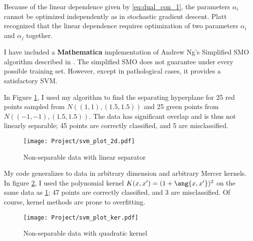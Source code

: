 \documentclass[10pt]{article}
\begin{document}
Because of the linear dependence given by \eqref{eq:dual_con_1}, the parameters $\alpha_{i}$ cannot be optimized independently as in stochastic gradient descent. Platt recognized that the linear dependence requires optimization of two parameters $\alpha_{i}$ and $\alpha_{j}$ together.

I have included a \textbf{Mathematica} implementation of Andrew Ng's Simplified SMO algorithm described in \cite{ng_smo}. The simplified SMO does not guarantee under every possible training set. However, except in pathological cases, it provides a satisfactory SVM.

In Figure \ref{fig:svm_plot_2d}, I used my algorithm to find the separating hyperplane for 25 red points sampled from $N((1,1),(1.5,1.5))$ and 25 green points from $N((-1,-1),(1.5,1.5))$. The data has significant overlap and is thus not linearly separable; 45 points are correctly classified, and 5 are misclassified.

\begin{figure}[htb]
				\begin{center}
				\texttt{[image: Project/svm\_plot\_2d.pdf]}
				\caption{Non-separable data with linear separator}
					\label{fig:svm_plot_2d}
				\end{center}
				\end{figure}

My code generalizes to data in arbitrary dimension and arbitrary Mercer kernels. In figure \ref{fig:svm_plot_ker}, I used the polynomial kernel $K(x,x')=(1+\ang{x,x'})^{2}$ on the same data as \ref{fig:svm_plot_2d}; 47 points are correctly classified, and 3 are misclassified. Of course, kernel methods are prone to overfitting.


\begin{figure}[htb]
				\begin{center}
				\texttt{[image: Project/svm\_plot\_ker.pdf]}
				\caption{Non-separable data with quadratic kernel}
					\label{fig:svm_plot_ker}
				\end{center}
				\end{figure}


\nocite{burges,platt1998sequential,ng,ng_smo}


\end{document}
